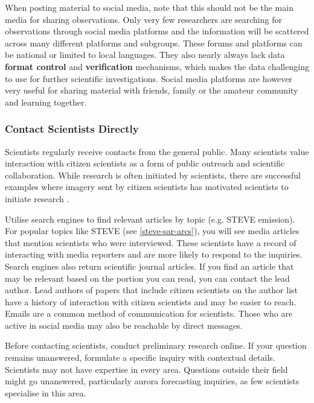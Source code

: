 \documentclass{article}
\renewcommand{\cite}[1]{\parencite{#1}}
\begin{document}
When posting material to social media, note that this should not be the main media for sharing observations. Only very few researchers are searching for observations through social media platforms and the information will be scattered across many different platforms and subgroups. These forums and platforms can be national or limited to local languages. They also nearly always lack data \textbf{format control} and \textbf{verification} mechanisms, which makes the data challenging to use for further scientific investigations. Social media platforms are however very useful for sharing material with friends, family or the amateur community and learning together. 



\subsubsection{Contact Scientists Directly}

Scientists regularly receive contacts from the general public. Many scientists value interaction with citizen scientists as a form of public outreach and scientific collaboration. While research is often initiated by scientists, there are successful examples where imagery sent by citizen scientists has motivated scientists to initiate research \cite{MacDonald2018,Nishimura2022,Nishimura2023,Palmroth2020}. 

Utilise search engines to find relevant articles by topic (e.g. STEVE emission). For popular topics like STEVE (see \ref{steve-sar-arcs}), you will see media articles that mention scientists who were interviewed. These scientists have a record of interacting with media reporters and are more likely to respond to the inquiries. Search engines also return scientific journal articles. If you find an article that may be relevant based on the portion you can read, you can contact the lead author. Lead authors of papers that include citizen scientists on the author list have a history of interaction with citizen scientists and may be easier to reach. Emails are a common method of communication for scientists. Those who are active in social media may also be reachable by direct messages. 

Before contacting scientists, conduct preliminary research online. If your question remains unanswered, formulate a specific inquiry with contextual details. Scientists may not have expertise in every area. Questions outside their field might go unanswered, particularly aurora forecasting inquiries, as few scientists specialise in this area. 
\end{document}
